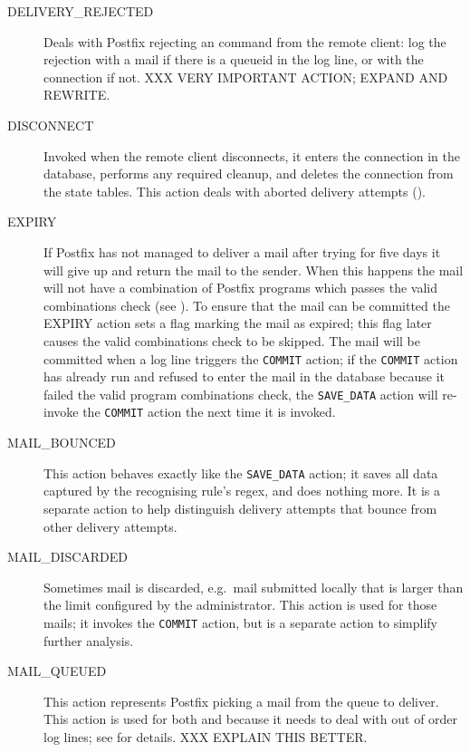 \begin{description}
    \item [DELIVERY\_REJECTED] Deals with Postfix rejecting an
         command from the remote client: log the rejection
        with a mail if there is a queueid in the log line, or with the
        connection if not.  XXX VERY IMPORTANT ACTION\@; EXPAND AND
        REWRITE\@.

    \item [DISCONNECT] Invoked when the remote client disconnects, it
        enters the connection in the database, performs any required
        cleanup, and deletes the connection from the state tables.  This
        action deals with aborted delivery attempts ().

    \item [EXPIRY] If Postfix has not managed to deliver a mail after
        trying for five days it will give up and return the mail to the
        sender.  When this happens the mail will not have a combination of
        Postfix programs which passes the valid combinations check (see
        ).  To ensure that the mail can
        be committed the EXPIRY action sets a flag marking the mail as
        expired; this flag later causes the valid combinations check to be
        skipped.  The mail will be committed when a log line triggers the
        \texttt{COMMIT} action; if the \texttt{COMMIT} action has already
        run and refused to enter the mail in the database because it failed
        the valid program combinations check, the \texttt{SAVE\_DATA}
        action will re-invoke the \texttt{COMMIT} action the next time it
        is invoked.

    \item [MAIL\_BOUNCED] This action behaves exactly like the
        \texttt{SAVE\_DATA} action; it saves all data captured by the
        recognising rule's regex, and does nothing more.  It is a separate
        action to help distinguish delivery attempts that bounce from other
        delivery attempts.

    \item [MAIL\_DISCARDED] Sometimes mail is discarded, e.g.\ mail
        submitted locally that is larger than the limit configured by the
        administrator.  This action is used for those mails; it invokes the
        \texttt{COMMIT} action, but is a separate action to simplify
        further analysis.

    \item [MAIL\_QUEUED] This action represents Postfix picking a mail from
        the queue to deliver.  This action is used for both 
        and  because it needs to deal with out of order log
        lines; see  for details.
        XXX EXPLAIN THIS BETTER\@.


\end{description}
